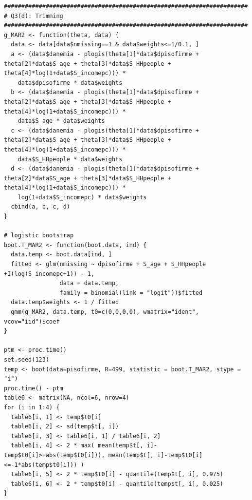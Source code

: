 \documentclass[12pt]{article}
\begin{document}
\begin{verbatim}
######################################################################
# Q3(d): Trimming
######################################################################
g_MAR2 <- function(theta, data) {
  data <- data[data$nmissing==1 & data$weights<=1/0.1, ]
  a <- (data$danemia - plogis(theta[1]*data$dpisofirme + theta[2]*data$S_age + theta[3]*data$S_HHpeople + theta[4]*log(1+data$S_incomepc))) * 
    data$dpisofirme * data$weights
  b <- (data$danemia - plogis(theta[1]*data$dpisofirme + theta[2]*data$S_age + theta[3]*data$S_HHpeople + theta[4]*log(1+data$S_incomepc))) * 
    data$S_age * data$weights
  c <- (data$danemia - plogis(theta[1]*data$dpisofirme + theta[2]*data$S_age + theta[3]*data$S_HHpeople + theta[4]*log(1+data$S_incomepc))) * 
    data$S_HHpeople * data$weights
  d <- (data$danemia - plogis(theta[1]*data$dpisofirme + theta[2]*data$S_age + theta[3]*data$S_HHpeople + theta[4]*log(1+data$S_incomepc))) * 
    log(1+data$S_incomepc) * data$weights
  cbind(a, b, c, d)
}

# logistic bootstrap
boot.T_MAR2 <- function(boot.data, ind) {
  data.temp <- boot.data[ind, ]
  fitted <- glm(nmissing ~ dpisofirme + S_age + S_HHpeople +I(log(S_incomepc+1)) - 1, 
                data = data.temp, 
                family = binomial(link = "logit"))$fitted
  data.temp$weights <- 1 / fitted
  gmm(g_MAR2, data.temp, t0=c(0,0,0,0), wmatrix="ident", vcov="iid")$coef
}

ptm <- proc.time()
set.seed(123)
temp <- boot(data=pisofirme, R=499, statistic = boot.T_MAR2, stype = "i")
proc.time() - ptm
table6 <- matrix(NA, ncol=6, nrow=4)
for (i in 1:4) {
  table6[i, 1] <- temp$t0[i]
  table6[i, 2] <- sd(temp$t[, i])
  table6[i, 3] <- table6[i, 1] / table6[i, 2]
  table6[i, 4] <- 2 * max( mean(temp$t[, i]-temp$t0[i]>=abs(temp$t0[i])), mean(temp$t[, i]-temp$t0[i]<=-1*abs(temp$t0[i])) )
  table6[i, 5] <- 2 * temp$t0[i] - quantile(temp$t[, i], 0.975)
  table6[i, 6] <- 2 * temp$t0[i] - quantile(temp$t[, i], 0.025)
}



\end{verbatim}
\end{document}
